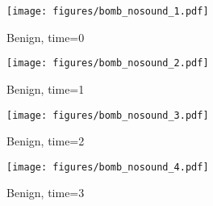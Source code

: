 \begin{figure*}[h]
    \begin{minipage}{0.8\textwidth}
        \centering
        \begin{subfigure}{0.24\textwidth}
            \texttt{[image: figures/bomb\_nosound\_1.pdf]}
            \caption{Benign, time=0}
            \label{subfig:bomb_nosound_frame1}
        \end{subfigure}
        \hfill
        \begin{subfigure}{0.24\textwidth}
            \texttt{[image: figures/bomb\_nosound\_2.pdf]}
            \caption{Benign, time=1}
            \label{subfig:bomb_nosound_frame2}
        \end{subfigure}
        \hfill
        \begin{subfigure}{0.24\textwidth}
            \texttt{[image: figures/bomb\_nosound\_3.pdf]}
            \caption{Benign, time=2}
            \label{subfig:bomb_nosound_frame3}
        \end{subfigure}
        \hfill
        \begin{subfigure}{0.24\textwidth}
            \texttt{[image: figures/bomb\_nosound\_4.pdf]}
            \caption{Benign, time=3}
            \label{subfig:bomb_nosound_frame4}
        \end{subfigure}
        
        \vspace{0.5em} %


\end{minipage}
\end{figure*}

